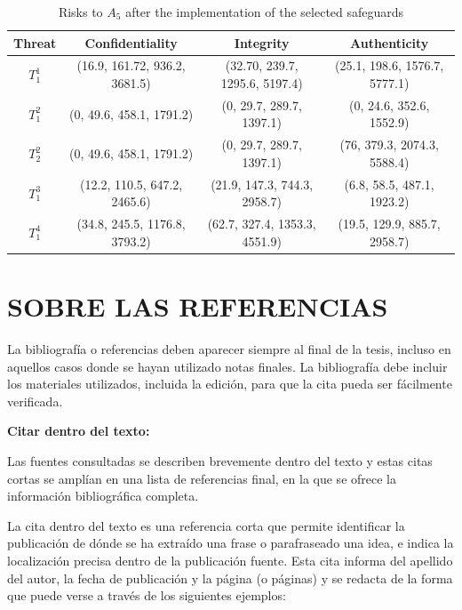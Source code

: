 \documentclass[spanish,12pt, a4paper, twoside]{paper}
\let\oldsection\section
\def\section{\cleardoublepage\oldsection}
\begin{document}
\begin{table}[htb]
\centering
\caption{Risks to $A_5$ after the implementation of the selected safeguards }
\label{table:risk}
\begin{tabular}{cccc}
\hline
\noalign{\smallskip} 
 {\scriptsize{Threat}}& {\scriptsize{Confidentiality}} & {\scriptsize{Integrity}} & {\scriptsize{Authenticity}}\tabularnewline
\hline  
{\scriptsize{$T_{1}^{1}$}} & \scriptsize{(16.9, 161.72, 936.2, 3681.5)} & \scriptsize{(32.70, 239.7, 1295.6, 5197.4)} & \scriptsize{(25.1, 198.6, 1576.7, 5777.1)}\\
{\scriptsize{$T_{1}^{2}$}} & \scriptsize{(0, 49.6, 458.1, 1791.2)} & \scriptsize{(0, 29.7, 289.7, 1397.1)} & \scriptsize{(0, 24.6, 352.6, 1552.9)}\\
{\scriptsize{$T_{2}^{2}$}} & \scriptsize{(0, 49.6, 458.1, 1791.2)} & \scriptsize{(0, 29.7, 289.7, 1397.1)} & \scriptsize{(76, 379.3, 2074.3, 5588.4)}\\
{\scriptsize{$T_{1}^{3}$}} & \scriptsize{(12.2, 110.5, 647.2, 2465.6)} & \scriptsize{(21.9, 147.3, 744.3, 2958.7)} & \scriptsize{(6.8, 58.5, 487.1, 1923.2)}\\ 
{\scriptsize{$T_{1}^{4}$}} & \scriptsize{(34.8, 245.5, 1176.8, 3793.2)} & \scriptsize{(62.7, 327.4, 1353.3, 4551.9)} & \scriptsize{(19.5, 129.9, 885.7, 2958.7)}\\
\hline 
\end{tabular}
\end{table}



\section{SOBRE LAS REFERENCIAS}

La bibliografía o referencias deben aparecer siempre al final de la tesis, incluso en aquellos casos donde se hayan utilizado notas finales. La bibliografía debe incluir los materiales utilizados, incluida la edición, para que la cita pueda ser fácilmente verificada. 

\bigskip
{\bf Citar dentro del texto:}

Las fuentes consultadas se describen brevemente dentro del texto y estas citas cortas se amplían en una lista de referencias final, en la que se ofrece la información bibliográfica completa. 

La cita dentro del texto es una referencia corta que permite identificar la publicación de dónde se ha extraído una frase o parafraseado una idea, e indica la localización precisa dentro de la publicación fuente. Esta cita informa del apellido del autor, la fecha de publicación y la página (o páginas) y se redacta de la forma que puede verse a través de los siguientes ejemplos:
\end{document}
